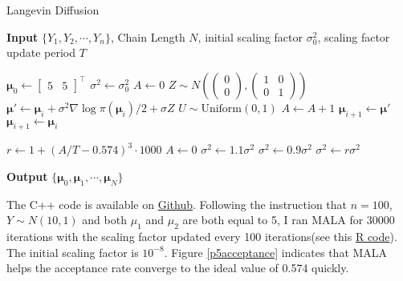 \documentclass[12pt]{article}
\begin{document}
\begin{algorithm}
	\caption{Langevin Diffusion}\label{langevin}
	\hspace*{\algorithmicindent} \textbf{Input}  $\{Y_1, Y_2, \cdots, Y_n \}$, Chain Length $N$, initial scaling factor $\sigma_0^2$, scaling factor update period $T$ 
	\begin{algorithmic}[1]
		\State $\bm{\mu}_0 \gets \begin{bmatrix}5 & 5\end{bmatrix}^\top$
		\State $\sigma^2 \gets \sigma_0^2$
		\State $A \gets 0$ 
		\State $Z\sim N\left(\begin{pmatrix}0 \\ 0\end{pmatrix}, \begin{pmatrix}1 & 0 \\ 0 & 1\end{pmatrix} \right)$
		\State $\bm{\mu}' \gets \bm{\mu}_i + \sigma^2 \nabla \log \pi(\bm{\mu}_i)/2 + \sigma Z$
		\State $U\sim \text{Uniform}(0, 1)$
		\State $A\gets A+1$
		\State $\bm{\mu}_{i+1}\gets \bm{\mu}'$
		\Else
		\State $\bm{\mu}_{i+1}\gets \bm{\mu}_{i}$
		\EndIf
		
		 
			\State $r\gets 1+(A/T - 0.574)^3 \cdot 1000$
			\State $A\gets 0$
				\State $\sigma^2 \gets 1.1\sigma^2$
				\State $\sigma^2 \gets 0.9\sigma^2$
			\Else
				\State $\sigma^2 \gets r \sigma^2$
			\EndIf
		\EndIf
		\EndFor
	\end{algorithmic}
	\hspace*{\algorithmicindent} \textbf{Output} $\{ \bm{\mu}_0, \bm{\mu}_1, \cdots, \bm{\mu}_N \}$
\end{algorithm}

The C++ code is available on \href{https://github.com/mkbwang/BIOSTAT882/blob/master/HW1/P5.cpp}{Github}. Following the instruction that $n=100$, $Y\sim N(10, 1)$ and both $\mu_1$ and $\mu_2$ are both equal to 5, I ran MALA for 30000 iterations with the scaling factor updated every 100 iterations(see this \href{https://github.com/mkbwang/BIOSTAT882/blob/master/HW1/P5.R}{R code}). The initial scaling factor is $10^{-8}$. Figure \ref{p5acceptance} indicates that MALA helps the acceptance rate converge to the ideal value of 0.574 quickly. 
\end{document}
